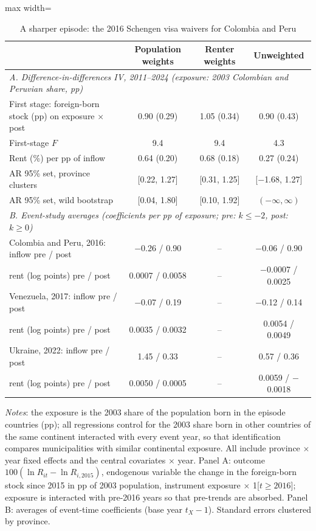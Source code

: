 \begin{table}[!htbp]\centering\small
\caption{A sharper episode: the 2016 Schengen visa waivers for Colombia and Peru}\label{tab:episode}
\begin{adjustbox}{max width=\linewidth}\begin{tabular}{lccc}\toprule
 & Population weights & Renter weights & Unweighted\\\midrule
\multicolumn{4}{l}{\textit{A. Difference-in-differences IV, 2011--2024 (exposure: 2003 Colombian and Peruvian share, pp)}}\\
First stage: foreign-born stock (pp) on exposure $\times$ post & 0.90 (0.29) & 1.05 (0.34) & 0.90 (0.43)\\
First-stage $F$ & 9.4 & 9.4 & 4.3\\
Rent (\%) per pp of inflow & 0.64 (0.20) & 0.68 (0.18) & 0.27 (0.24)\\
AR 95\% set, province clusters & [0.22, 1.27] & [0.31, 1.25] & [$-$1.68, 1.27]\\
AR 95\% set, wild bootstrap & [0.04, 1.80] & [0.10, 1.92] & $(-\infty,\infty)$\\
\midrule\multicolumn{4}{l}{\textit{B. Event-study averages (coefficients per pp of exposure; pre: $k\le-2$, post: $k\ge0$)}}\\
Colombia and Peru, 2016: inflow pre / post & $-$0.26 / 0.90 & -- & $-$0.06 / 0.90\\
\quad rent (log points) pre / post & 0.0007 / 0.0058 & -- & $-$0.0007 / 0.0025\\
Venezuela, 2017: inflow pre / post & $-$0.07 / 0.19 & -- & $-$0.12 / 0.14\\
\quad rent (log points) pre / post & 0.0035 / 0.0032 & -- & 0.0054 / 0.0049\\
Ukraine, 2022: inflow pre / post & 1.45 / 0.33 & -- & 0.57 / 0.36\\
\quad rent (log points) pre / post & 0.0050 / 0.0005 & -- & 0.0059 / $-$0.0018\\
\bottomrule\end{tabular}\end{adjustbox}
\begin{minipage}{0.97\linewidth}\footnotesize\vspace{4pt}
\textit{Notes}: the exposure is the 2003 share of the population born in the episode countries (pp); all regressions control for the 2003 share born in other countries of the same continent interacted with every event year, so that identification compares municipalities with similar continental exposure. All include province $\times$ year fixed effects and the central covariates $\times$ year. Panel A: outcome $100(\ln R_{it}-\ln R_{i,2015})$, endogenous variable the change in the foreign-born stock since 2015 in pp of 2003 population, instrument exposure $\times$ 1[$t\ge2016$]; exposure is interacted with pre-2016 years so that pre-trends are absorbed. Panel B: averages of event-time coefficients (base year $t_X-1$). Standard errors clustered by province.
\end{minipage}\end{table}